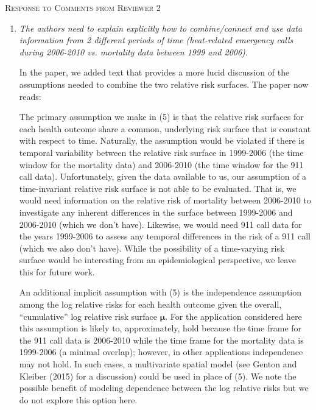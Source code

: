 \documentclass{article}
\begin{document}
\begin{center}{\large\textsc{Response to Comments from Reviewer 2}}\end{center}
\begin{enumerate}
\item\textit{The authors need to explain explicitly how to combine/connect and use data information from 2 different periods of time (heat-related emergency calls during 2006-2010 vs. mortality data between 1999 and 2006).}

In the paper, we added text that provides a more lucid discussion of the assumptions needed to combine the two relative risk surfaces.  The paper now reads:

\begin{displayquote}
  The primary assumption we make in (5) is that the relative risk surfaces for each health outcome share a common, underlying risk surface that is constant with respect to time. Naturally, the assumption would be violated if there is temporal variability between the relative risk surface in 1999-2006 (the time window for the mortality data) and 2006-2010 (the time window for the 911 call data). Unfortunately, given the data available to us, our assumption of a time-invariant relative risk surface is not able to be evaluated. That is, we would need information on the relative risk of mortality between 2006-2010 to investigate any inherent differences in the surface between 1999-2006 and 2006-2010 (which we don't have). Likewise, we would need 911 call data for the years 1999-2006 to assess any temporal differences in the risk of a 911 call (which we also don't have). While the possibility of a time-varying risk surface would be interesting from an epidemiological perspective, we leave this for future work.

An additional implicit assumption with (5) is the independence assumption among the log relative risks for each health outcome given the overall, ``cumulative'' log relative risk surface $\boldsymbol{\mu}$. For the application considered here this assumption is likely to, approximately, hold because the time frame for the 911 call data is 2006-2010 while the time frame for the mortality data is 1999-2006 (a minimal overlap); however, in other applications independence may not hold. In such cases, a multivariate spatial model (see Genton and Kleiber (2015) for a discussion) could be used in place of (5). We note the possible benefit of modeling dependence between the log relative risks but we do not explore this option here.
\end{displayquote}


\end{enumerate}
\end{document}
